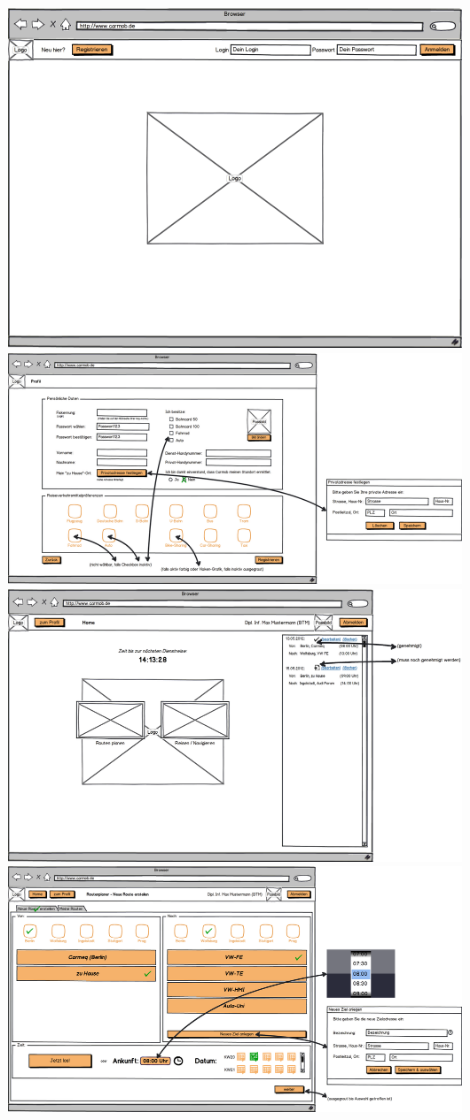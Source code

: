 \documentclass{article}
\begin{document}
\begin{center}
\includegraphics[width=12cm]{10_finaler_paperprototyp_001.png}\\
\includegraphics[width=12cm]{10_finaler_paperprototyp_002.png}\\
\includegraphics[width=12cm]{10_finaler_paperprototyp_003.png}\\
\includegraphics[width=12cm]{10_finaler_paperprototyp_004.png}\\

\end{center}
\end{document}
